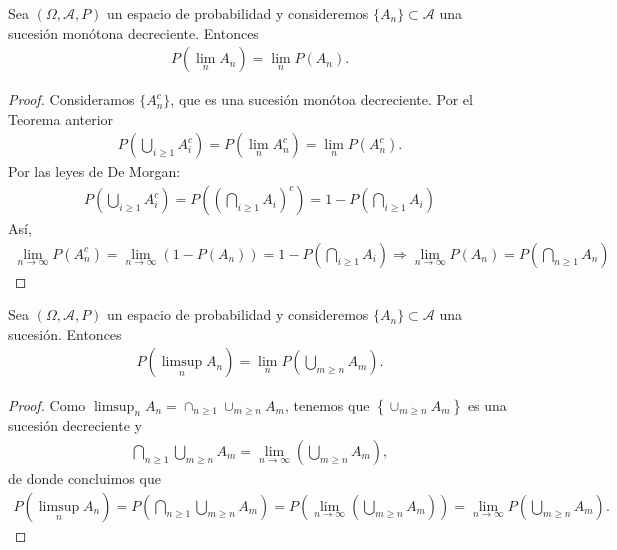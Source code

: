 \begin{teo}
    Sea $(\Omega,\mathcal{A},P)$ un espacio de probabilidad y consideremos $\{A_n\} \subset \mathcal{A}$ una sucesión monótona decreciente. Entonces
    \begin{align*}
        P\left( \lim_n A_n \right) = \lim_n P(A_n).
    \end{align*}
\end{teo}

\begin{proof}
    Consideramos $\{A_n^c\}$, que es una sucesión monótoa decreciente. Por el Teorema anterior
    \begin{align*}
       P\left( \bigcup_{i \ge 1} A_i^c \right) = P\left( \lim_n A_n^c \right) = \lim_n P(A_n^c).
    \end{align*}
    Por las leyes de De Morgan:
    \begin{align*}
        P\left( \bigcup_{i \ge 1} A_i^c \right) = P\left( \left( \bigcap_{i \ge 1} A_i \right)^c \right) = 1 - P\left( \bigcap_{i \ge 1} A_i \right)
    \end{align*}
    Así,
    \begin{align*}
        \lim_{n \to \infty} P(A_n^c) = \lim_{n \to \infty} \left( 1 - P(A_n)\right) = 1 - P\left( \bigcap_{i \ge 1} A_i \right) \Longrightarrow \lim_{n \to \infty} P(A_n) = P \left( \bigcap_{n \ge 1} A_n \right)
    \end{align*}
\end{proof}

\begin{teo}
    Sea $(\Omega,\mathcal{A},P)$ un espacio de probabilidad y consideremos $\{A_n\} \subset \mathcal{A}$ una sucesión. Entonces
    \begin{align*}
        P\left( \limsup_n A_n \right) = \lim_n P\left( \bigcup_{m \ge n} A_m \right).
    \end{align*}
\end{teo}

\begin{proof}
    Como $\limsup_n A_n = \cap_{n \ge 1} \cup_{m \ge n} A_m$, tenemos que $\left\{ \cup_{m \ge n} A_m \right\}$ es una sucesión decreciente y 
    \begin{align*}
        \bigcap_{n \ge 1} \bigcup_{m \ge n} A_m = \lim_{n \to \infty} \left( \bigcup_{m \ge n} A_m \right),
    \end{align*}
    de donde concluimos que
    \begin{align*}
        P\left( \limsup_n A_n \right) = P\left( \bigcap_{n \ge 1} \bigcup_{m \ge n} A_m  \right) = P\left( \lim_{n \to \infty} \left( \bigcup_{m \ge n} A_m \right) \right) = \lim_{n \to \infty} P\left( \bigcup_{m \ge n} A_m \right).
    \end{align*}
\end{proof}

